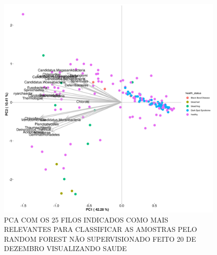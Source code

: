 \documentclass[12pt, a4paper]{report}
\begin{document}
\begin{figure}[H]
	\centering
	\includegraphics[scale=0.4]{figures/PCA_rf_nao_super_25_157_corais_health_2018_12_20.png}
	\caption{PCA COM OS 25 FILOS INDICADOS COMO MAIS RELEVANTES PARA CLASSIFICAR AS AMOSTRAS PELO RANDOM FOREST NÃO SUPERVISIONADO FEITO 20 DE DEZEMBRO VISUALIZANDO SAUDE}
	\label{fig: PCA COM OS 25 FILOS INDICADOS COMO MAIS RELEVANTES PARA CLASSIFICAR AS AMOSTRAS PELO RANDOM FOREST NÃO SUPERVISIONADO FEITO 20 DE DEZEMBRO VISUALIZANDO SAUDE DE CORAIS}
\end{figure}
\end{document}
